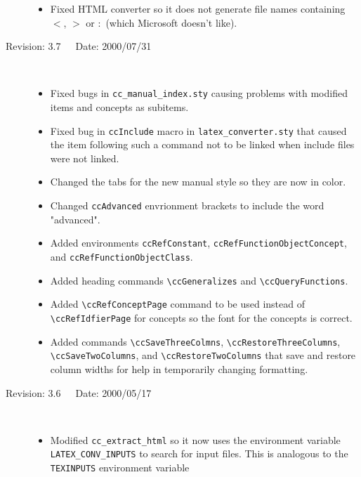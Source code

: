 \documentclass[11pt]{article}
\begin{document}
\begin{description}
\begin{itemize}
        \item Fixed HTML converter so it does not generate file names 
              containing $<$, $>$ or $:$ (which Microsoft doesn't like).
    \end{itemize}
    \item[Revision: 3.7~~~Date: 2000/07/31]~\\[-3mm]
    \begin{itemize}
        \item Fixed bugs in {\tt cc\_manual\_index.sty} causing problems with
              modified items and concepts as subitems.
        \item Fixed bug in {\tt ccInclude} macro in {\tt latex\_converter.sty} 
              that caused the item following such a command not to be linked
              when include files were not linked.
        \item Changed the tabs for the new manual style so they are now in 
              color.
        \item Changed {\tt ccAdvanced} envrionment brackets to include the
              word "advanced". 
        \item Added environments {\tt ccRefConstant}, 
              {\tt ccRefFunctionObjectConcept}, and 
              {\tt ccRefFunctionObjectClass}. 
        \item Added heading commands \verb|\ccGeneralizes| and 
              \verb|\ccQueryFunctions|.
        \item Added \verb|\ccRefConceptPage| command to be used instead of
              \verb|\ccRefIdfierPage| for concepts so the font for the concepts
              is correct.
        \item Added commands \verb|\ccSaveThreeColmns|, 
              \verb|\ccRestoreThreeColumns|, \verb|\ccSaveTwoColumns|,
              and \verb|\ccRestoreTwoColumns| that save and restore column
              widths for help in temporarily changing formatting.
    \end{itemize}
    \item[Revision: 3.6~~~Date: 2000/05/17]~\\[-3mm]
    \begin{itemize}
       \item  Modified \verb|cc_extract_html| so it now uses the environment
              variable \verb|LATEX_CONV_INPUTS| to search for input files.
              This is analogous to the \verb|TEXINPUTS| environment variable

\end{itemize}
\end{description}
\end{document}
